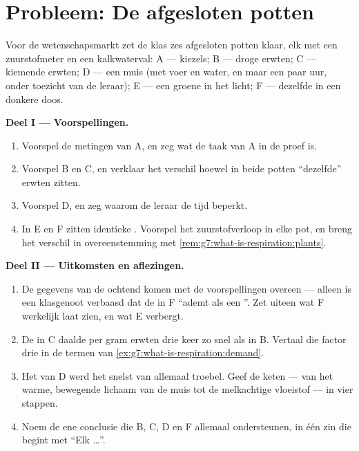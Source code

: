 \section{Probleem: De afgesloten potten}

\begin{problem}\label{pb:g7:what-is-respiration:1}
Voor de wetenschapsmarkt zet de klas zes afgesloten potten klaar, elk met
een zuurstofmeter en een kalkwaterval: A --- kiezels; B --- droge erwten;
C --- kiemende erwten; D --- een muis (met voer en water, en maar een paar
uur, onder toezicht van de leraar); E --- een groene  in het licht;
F --- dezelfde   in een donkere doos.

\medskip\noindent\textbf{Deel I --- Voorspellingen.}
\begin{enumerate}
  \item Voorspel de metingen van A, en zeg wat de taak van A in de proef
        is.
  \item Voorspel B en C, en verklaar het verschil hoewel in beide potten
        ``dezelfde'' erwten zitten.
  \item Voorspel D, en zeg waarom de leraar de tijd beperkt.
  \item In E en F zitten identieke . Voorspel het zuurstofverloop
        in elke pot, en breng het verschil in overeenstemming met
        \cref{rem:g7:what-is-respiration:plants}.
\end{enumerate}

\medskip\noindent\textbf{Deel II --- Uitkomsten en aflezingen.}
\begin{enumerate}[resume]
  \item De gegevens van de ochtend komen met de voorspellingen overeen
        --- alleen is een klasgenoot verbaasd dat de  in F ``ademt
        als een ''. Zet uiteen wat F werkelijk laat zien, en wat E
        verbergt.
  \item De  in C daalde per gram erwten drie keer zo snel als in
        B. Vertaal die factor drie in de termen van
        \cref{ex:g7:what-is-respiration:demand}.
  \item Het  van D werd het snelst van allemaal troebel. Geef de
        keten --- van het warme, bewegende lichaam van de muis tot de
        melkachtige vloeistof --- in vier stappen.
  \item Noem de ene conclusie die B, C, D en F allemaal ondersteunen, in
        één zin die begint met ``Elk \dots''.
\end{enumerate}


\end{problem}
